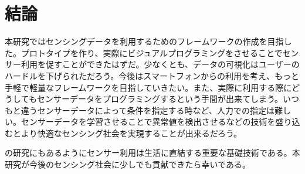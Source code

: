 \chapter{結論}
\label{chap:conclusion}
本研究ではセンシングデータを利用するためのフレームワークの作成を目指した。プロトタイプを作り、実際にビジュアルプログラミングをさせることでセンサー利用を促すことができたはずだ。少なくとも、データの可視化はユーザーのハードルを下げられただろう。今後はスマートフォンからの利用を考え、もっと手軽で軽量なフレームワークを目指していきたい。また、実際に利用する際にどうしてもセンサーデータをプログラミングするという手間が出来てしまう。いつもと違うセンサーデータによって条件を指定する時など、人力での指定は難しい。センサーデータを学習させることで異常値を検出させるなどの技術を盛り込むとより快適なセンシング社会を実現することが出来るだろう。

\cite{source01}の研究にもあるようにセンサー利用は生活に直結する重要な基礎技術である。本研究が今後のセンシング社会に少しでも貢献できたら幸いである。

